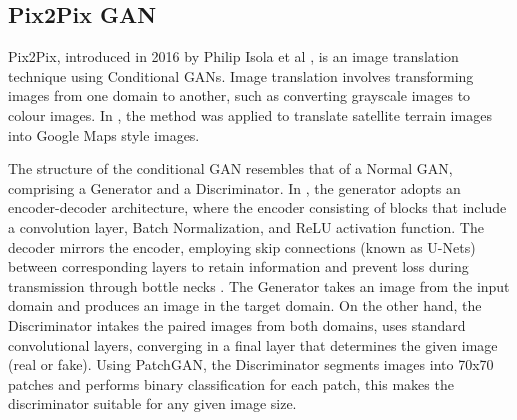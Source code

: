 \documentclass[12pt,twoside,a4paper,parskip]{scrbook} %
\begin{document}
\subsection{Pix2Pix GAN}
Pix2Pix, introduced in 2016 by Philip Isola et al \cite{11_image2_image}, is an image translation technique using Conditional GANs. Image translation involves transforming images from one domain to another, such as converting grayscale images to colour images. In \cite{12_pix2pix}, the method was applied to translate satellite terrain images into Google Maps style images. 

The structure of the conditional GAN resembles that of a Normal GAN, comprising a Generator and a Discriminator. In \cite{12_pix2pix}, the generator adopts an encoder-decoder architecture, where the encoder consisting of blocks that include a convolution layer, Batch Normalization, and ReLU activation function. The decoder mirrors the encoder, employing skip connections (known as U-Nets) between corresponding layers to retain information and prevent loss during transmission through bottle necks \cite{11_image2_image}. The Generator takes an image from the input domain and produces an image in the target domain. On the other hand, the Discriminator intakes the paired images from both domains, uses standard convolutional layers, converging in a final layer that determines the given image (real or fake). Using PatchGAN, the Discriminator segments images into 70x70 patches and performs binary classification for each patch, this makes the discriminator suitable for any given image size.
\end{document}
